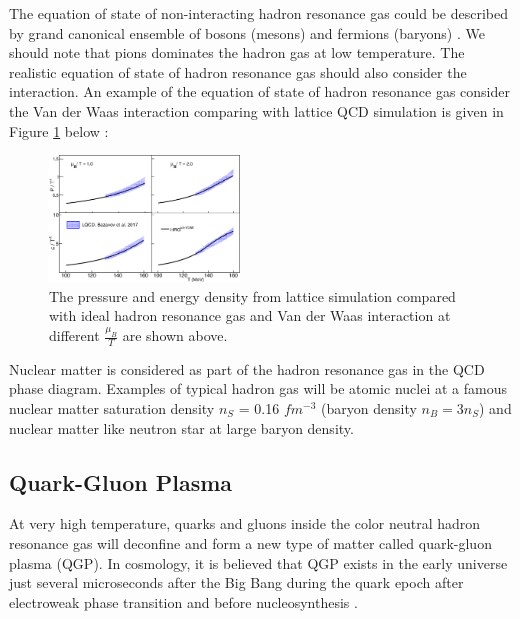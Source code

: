 The equation of state of non-interacting hadron resonance gas could be described by grand canonical ensemble of bosons (mesons) and fermions (baryons) \cite{StatMechHadron}. We should note that pions dominates the hadron gas at low temperature. The realistic equation of state of hadron resonance gas should also consider the interaction. An example of the equation of state of hadron resonance gas consider the Van der Waas interaction comparing with lattice QCD simulation is given in Figure \ref{EOSHadronLattice} below \cite{EOSHadron}:

\begin{figure}[hbtp]
\begin{center}
\includegraphics[width=0.45\textwidth]{Figures/Chapter1/EOSHadronGas.png}
\caption{The pressure and energy density from lattice simulation compared with ideal hadron resonance gas and Van der Waas interaction at different $\frac{\mu_B}{T}$ are shown above.}
\label{EOSHadronLattice}
\end{center}
\end{figure} 



Nuclear matter is considered as part of the hadron resonance gas in the QCD phase diagram. Examples of typical hadron gas will be atomic nuclei at a famous nuclear matter saturation density $n_S$ = 0.16 $fm^{-3}$ (baryon density $n_B = 3 n_S$) and nuclear matter like neutron star at large baryon density. 

\subsection{Quark-Gluon Plasma}

At very high temperature, quarks and gluons inside the color neutral hadron resonance gas will deconfine and form a new type of matter called quark-gluon plasma (QGP). In cosmology, it is believed that QGP exists in the early universe just several microseconds after the Big Bang during the quark epoch after electroweak phase transition and before nucleosynthesis \cite{QGPCosmology}. 

